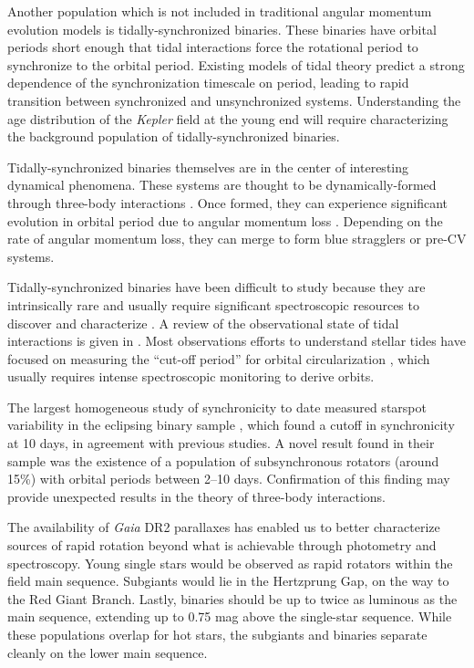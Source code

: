 \documentclass[manuscript]{aastex6}
\newcommand{\Kepler}{\mbox{\textit{Kepler}}}
\newcommand{\Gaia}{\mbox{\textit{Gaia}}}
\begin{document}
Another population which is not included in traditional angular momentum
evolution models is tidally-synchronized binaries. These binaries have orbital 
periods short enough that tidal interactions force the rotational period to
synchronize to the orbital period. Existing models of tidal theory 
\citep{Zahn77} predict a strong dependence of the synchronization timescale 
on period, leading to rapid transition between
synchronized and unsynchronized systems. Understanding the 
age distribution of the \Kepler{} field at the young end will require 
characterizing the background population of tidally-synchronized binaries.

Tidally-synchronized binaries themselves are in the center of interesting
dynamical phenomena. These systems are thought to be dynamically-formed 
through three-body interactions \citep{Tokovinin06, Fabrycky07}. Once formed, they can experience significant
evolution in orbital period due to angular momentum loss \citep{Andronov06}.
Depending on the rate of angular momentum loss, they can merge to form blue 
stragglers or pre-CV systems.

Tidally-synchronized binaries have been difficult to study because they are 
intrinsically rare and usually require significant spectroscopic resources 
to discover and characterize \citep{Mathieu90, Raghavan10, Geller15}. A review 
of the observational state of tidal interactions is given in \citet{Mazeh08}. 
Most observations efforts to understand stellar tides have focused on 
measuring the ``cut-off period'' for orbital circularization \citep{Mayor84},
which usually requires intense spectroscopic monitoring to derive orbits.

The largest homogeneous study of synchronicity to date measured starspot 
variability in the eclipsing binary sample \citep{Lurie17}, which found a
cutoff in synchronicity at 10 days, in agreement with previous studies. A novel
result found in their sample was the existence of a population of
subsynchronous rotators (around 15\%) with orbital periods between 2--10 days.
Confirmation of this finding may provide unexpected results in the theory of
three-body interactions.

The availability of \Gaia{} DR2 parallaxes \citep{Gaia18,Lindegren18} has
enabled us to better characterize sources of rapid rotation beyond what is
achievable through photometry and spectroscopy. Young single stars would be
observed as rapid rotators within the field main sequence. Subgiants would lie 
in the Hertzprung Gap, on the way to the Red Giant Branch. Lastly, binaries 
should be up to twice as luminous as the main sequence, extending up to 0.75 
mag above the single-star sequence.  While these populations overlap for hot 
stars, the subgiants and binaries separate cleanly on the lower main sequence.
\end{document}
